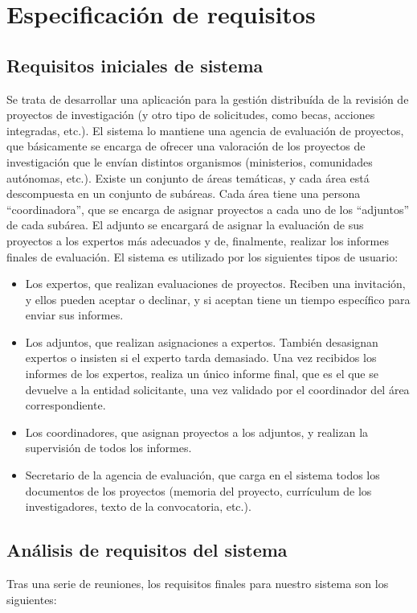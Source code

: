 \documentclass[12pt,a4paper,spanish,twoside]{article}
\begin{document}
\section{Especificación de requisitos}
\subsection{Requisitos iniciales de sistema}
Se trata de desarrollar una aplicación para la gestión distribuída de la
revisión de proyectos de investigación (y otro tipo de solicitudes, como
becas, acciones integradas, etc.). El sistema lo mantiene una agencia de
evaluación de proyectos, que básicamente se encarga de ofrecer una valoración
de los proyectos de investigación que le envían distintos organismos
(ministerios, comunidades autónomas, etc.). Existe un conjunto de áreas
temáticas, y cada área está descompuesta en un conjunto de subáreas. Cada
área tiene una persona ``coordinadora'', que se encarga de asignar proyectos
a cada uno de los ``adjuntos'' de cada subárea. El adjunto se encargará de
asignar la evaluación de sus proyectos a los expertos más adecuados y de,
finalmente, realizar los informes finales de evaluación. El sistema es
utilizado por los siguientes tipos de usuario: 

\begin{itemize}
\item Los expertos, que realizan evaluaciones de proyectos. Reciben una 
  invitación, y ellos pueden aceptar o declinar, y si aceptan tiene un tiempo 
  específico para enviar sus informes. 
\item Los adjuntos, que realizan asignaciones a expertos. También desasignan
  expertos o insisten si el experto tarda demasiado. Una vez recibidos los 
  informes de los expertos, realiza un único informe final, que es el que se 
  devuelve a la entidad solicitante, una vez validado por el coordinador del 
  área correspondiente. 
\item Los coordinadores, que asignan proyectos a los adjuntos, y realizan la
  supervisión de todos los informes.
\item Secretario de la agencia de evaluación, que carga en el sistema todos
  los documentos de los proyectos (memoria del proyecto, currículum de los
  investigadores, texto de la convocatoria, etc.). 
\end{itemize}

\subsection{Análisis de requisitos del sistema}
Tras una serie de reuniones, los requisitos finales para nuestro sistema son
los siguientes: 
\end{document}
